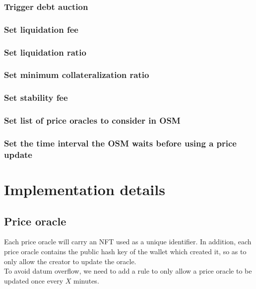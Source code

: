 \documentclass{article} %
\begin{document}
\subsubsection{Trigger debt auction}

\subsubsection{Set liquidation fee}

\subsubsection{Set liquidation ratio}

\subsubsection{Set minimum collateralization ratio}

\subsubsection{Set stability fee}

\subsubsection{Set list of price oracles to consider in OSM}

\subsubsection{Set the time interval the OSM waits before using a price update}


\section{Implementation details}


\subsection{Price oracle}

Each price oracle will carry an NFT used as a unique identifier.
In addition, each price oracle contains the public hash key of the wallet which
created it, so as to only allow the creator to update the oracle. \\

To avoid datum overflow, we need to add a rule to only allow a price oracle to
be updated once every $X$ minutes.
\end{document}
